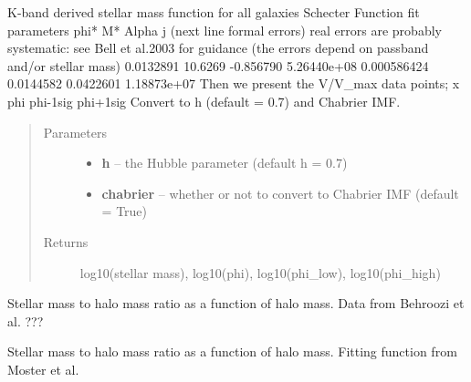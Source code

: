\documentclass[letterpaper,10pt,english]{sphinxmanual}
\begin{document}
\begin{fulllineitems}
\label{SamPy.astronomy:SamPy.astronomy.stellarMFs.bellK}
K-band derived stellar mass function for all galaxies
Schecter Function fit parameters
phi* M* Alpha j  (next line formal errors)
real errors are probably systematic: see Bell et al.2003 for
guidance (the errors depend on passband and/or stellar mass)
0.0132891      10.6269    -0.856790  5.26440e+08
0.000586424    0.0144582    0.0422601  1.18873e+07
Then we present the V/V\_max data points; x   phi  phi-1sig  phi+1sig
Convert to h (default = 0.7) and Chabrier IMF.
\begin{quote}\begin{description}
\item[{Parameters}] \leavevmode\begin{itemize}
\item {} 
\textbf{h} -- the Hubble parameter (default h = 0.7)

\item {} 
\textbf{chabrier} -- whether or not to convert to Chabrier IMF (default = True)

\end{itemize}

\item[{Returns}] \leavevmode
log10(stellar mass), log10(phi), log10(phi\_low), log10(phi\_high)

\end{description}\end{quote}

\end{fulllineitems}



\begin{fulllineitems}
\label{SamPy.astronomy:SamPy.astronomy.stellarMFs.fstarBehroozi}
Stellar mass to halo mass ratio as a function of halo mass.
Data from Behroozi et al. ???

\end{fulllineitems}



\begin{fulllineitems}
\label{SamPy.astronomy:SamPy.astronomy.stellarMFs.fstarBen}
Stellar mass to halo mass ratio as a function of halo mass.
Fitting function from Moster et al.

\end{fulllineitems}
\end{document}
